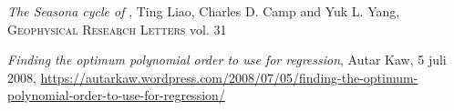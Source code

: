 \begin{thebibliography}{99}
	 \emph{The Seasona cycle of }, Ting Liao, Charles D. Camp and Yuk L. Yang, \textsc{Geophysical Research Letters} vol. 31 
    
     \emph{Finding the optimum polynomial order to use for regression}, Autar Kaw, 5 juli 2008, \url{https://autarkaw.wordpress.com/2008/07/05/finding-the-optimum-polynomial-order-to-use-for-regression/}
\end{thebibliography}	
